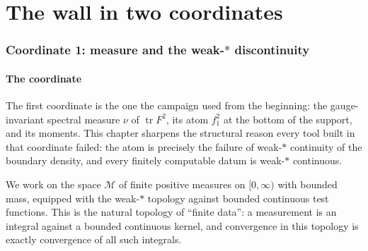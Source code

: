 \clearpage
\part{The wall in two coordinates}
\section{Coordinate 1: measure and the weak-$*$ discontinuity}
\label{ch:weakstar}

\subsection{The coordinate}

The first coordinate is the one the campaign used from the beginning: the gauge-invariant
spectral measure $\nu$ of $\operatorname{tr}F^2$, its atom $f_1^2$ at the bottom of the support,
and its moments. This chapter sharpens the structural reason every tool built in that coordinate
failed: the atom is precisely the failure of weak-$*$ continuity of the boundary density, and
every finitely computable datum is weak-$*$ continuous.

We work on the space $\mathcal M$ of finite positive measures on $[0,\infty)$ with bounded mass,
equipped with the weak-$*$ topology against bounded continuous test functions. This is the
natural topology of ``finite data'': a measurement is an integral against a bounded continuous
kernel, and convergence in this topology is exactly convergence of all such integrals.

